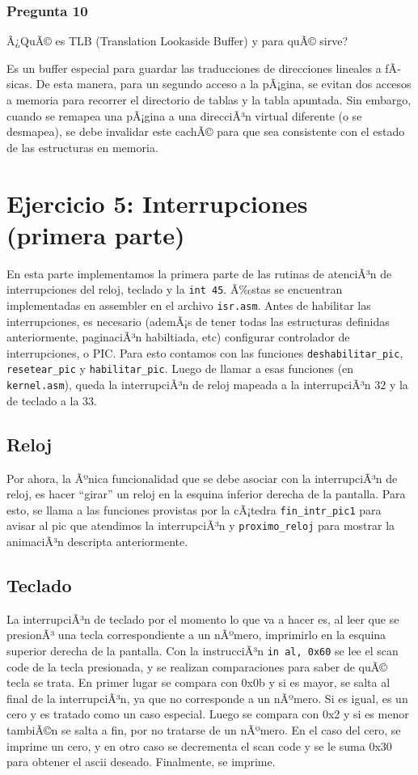 \documentclass[10pt, a4paper]{article}
\begin{document}
\subsubsection*{Pregunta 10}
 \begin{framed}
Â¿QuÃ© es TLB (Translation Lookaside Buffer) y para quÃ© sirve?
\end{framed}
Es un buffer especial para guardar las traducciones de direcciones lineales a fÃ­sicas. De esta manera, para un segundo acceso a la pÃ¡gina, se evitan dos accesos a memoria para recorrer el directorio de tablas y la tabla apuntada. Sin embargo, cuando se remapea una pÃ¡gina a una direcciÃ³n virtual diferente (o se desmapea), se debe invalidar este cachÃ© para que sea consistente con el estado de las estructuras en memoria.

\newpage
\section{Ejercicio 5: Interrupciones (primera parte)}
En esta parte implementamos la primera parte de las rutinas de atenciÃ³n de interrupciones del reloj, teclado y la \texttt{int 45}. 
Ã‰stas se encuentran implementadas en assembler en el archivo \texttt{isr.asm}.
Antes de habilitar las interrupciones, es necesario (ademÃ¡s de tener todas las estructuras definidas anteriormente, paginaciÃ³n habiltiada, etc) configurar controlador de interrupciones,
o PIC. Para esto contamos con las funciones \texttt{deshabilitar\_pic}, \texttt{resetear\_pic} y \texttt{habilitar\_pic}. Luego de llamar a esas funciones (en \texttt{kernel.asm}), queda la 
interrupciÃ³n de reloj mapeada a la interrupciÃ³n 32 y la de teclado a la 33.
\subsection{Reloj}
Por ahora, la Ãºnica funcionalidad que se debe asociar con la interrupciÃ³n de reloj, es hacer ``girar'' un reloj en la esquina inferior derecha de la pantalla. 
Para esto, se llama a las funciones provistas por la cÃ¡tedra \texttt{fin\_intr\_pic1} para avisar al pic que atendimos la interrupciÃ³n y \texttt{proximo\_reloj} 
para mostrar la animaciÃ³n descripta anteriormente.

\subsection{Teclado}

La interrupciÃ³n de teclado por el momento lo que va a hacer es, al leer que se presionÃ³ una tecla correspondiente a un nÃºmero, imprimirlo en la esquina superior 
derecha de la pantalla. Con la instrucciÃ³n \texttt{in al, 0x60} se lee el scan code de la tecla presionada, y se realizan comparaciones para saber de quÃ© tecla se 
trata. En primer lugar se compara con 0x0b y si es mayor, se salta al final de la interrupciÃ³n, ya que no corresponde a un nÃºmero. Si es igual, es un cero y es 
tratado como un caso especial. Luego se compara con 0x2 y si es menor tambiÃ©n se salta a fin, por no tratarse de un nÃºmero. En el caso del cero, se imprime un cero,
y en otro caso se decrementa el scan code y se le suma 0x30 para obtener el ascii deseado. Finalmente, se imprime.
\end{document}
